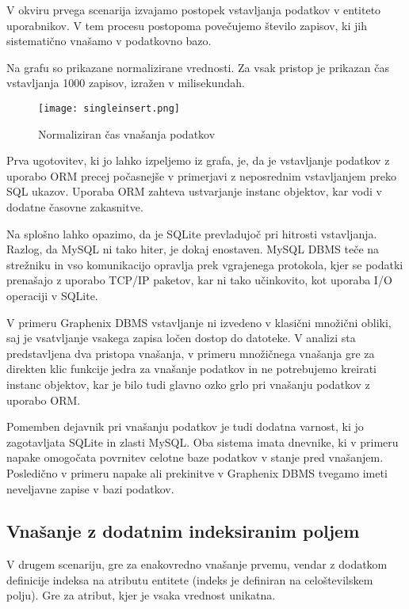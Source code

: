 \documentclass[a4paper,12pt,openright]{book}
\begin{document}
    V okviru prvega scenarija izvajamo postopek vstavljanja podatkov v entiteto uporabnikov. V tem procesu postopoma povečujemo število zapisov, ki jih sistematično vnašamo v podatkovno bazo.

    Na grafu so prikazane normalizirane vrednosti. Za vsak pristop je prikazan čas vstavljanja 1000 zapisov, izražen v milisekundah.
   
   \begin{figure}[H]
        \centerline{\texttt{[image: singleinsert.png]}}
        \caption{Normaliziran čas vnašanja podatkov}
        \label{vnos}
    \end{figure}

    \noindent
    Prva ugotovitev, ki jo lahko izpeljemo iz grafa, je, da je vstavljanje podatkov z uporabo ORM precej počasnejše v primerjavi z neposrednim vstavljanjem preko SQL ukazov. Uporaba ORM zahteva ustvarjanje instanc objektov, kar vodi v dodatne časovne zakasnitve.

    Na splošno lahko opazimo, da je SQLite prevladujoč pri hitrosti vstavljanja. Razlog, da MySQL ni tako hiter, je dokaj enostaven. MySQL DBMS teče na strežniku in vso komunikacijo opravlja prek vgrajenega protokola, kjer se podatki prenašajo z uporabo TCP/IP paketov, kar ni tako učinkovito, kot uporaba I/O operaciji v SQLite.

    V primeru Graphenix DBMS vstavljanje ni izvedeno v klasični množični obliki, saj je vsatvljanje vsakega zapisa ločen dostop do datoteke. V analizi sta predstavljena dva pristopa vnašanja, v primeru množičnega vnašanja gre za direkten klic funkcije jedra za vnašanje podatkov in ne potrebujemo kreirati instanc objektov, kar je bilo tudi glavno ozko grlo pri vnašanju podatkov z uporabo ORM.

    Pomemben dejavnik pri vnašanju podatkov je tudi dodatna varnost, ki jo zagotavljata SQLite in zlasti MySQL. Oba sistema imata dnevnike, ki v primeru napake omogočata povrnitev celotne baze podatkov v stanje pred vnašanjem. Posledično v primeru napake ali prekinitve v Graphenix DBMS tvegamo imeti neveljavne zapise v bazi podatkov.

    \subsection{Vnašanje z dodatnim indeksiranim poljem}

    V drugem scenariju, gre za enakovredno vnašanje prvemu, vendar z dodatkom definicije indeksa na atributu entitete (indeks je definiran na celoštevilskem polju). Gre za atribut, kjer je vsaka vrednost unikatna.
    
\end{document}
